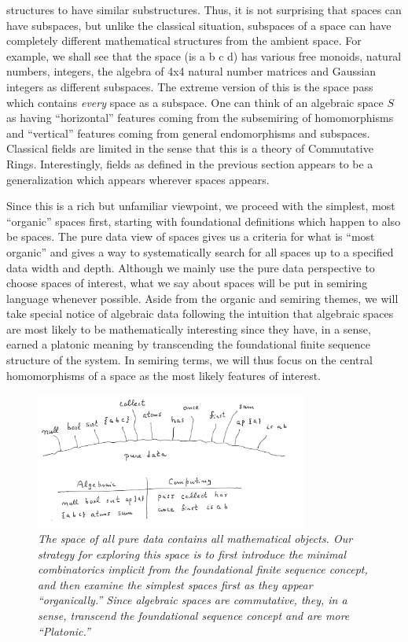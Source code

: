 \documentclass[11pt]{article}
\begin{document}
\begin{itemize}
{structures to have similar substructures.  Thus, it is not surprising that spaces can have subspaces, but unlike the classical situation, 
subspaces of a space can have completely different mathematical structures from the ambient space.  For example, we shall see that 
the space (is a b c d) has various free monoids, natural numbers, integers, the algebra of 4x4 natural number matrices and 
Gaussian integers as different subspaces.  The extreme version of this is the space pass which contains {\it every} space as a subspace.  One can think of 
an algebraic space $S$ as having ``horizontal'' features coming from the subsemiring of homomorphisms and ``vertical'' features 
coming from general endomorphisms and subspaces.  Classical fields are limited in the sense that this is a theory of Commutative Rings.  Interestingly, 
fields as defined in the previous section appears to be a generalization which appears wherever spaces appears.} 
\end{itemize}
Since this is a rich but unfamiliar 
viewpoint, we proceed with the simplest, most ``organic'' spaces first, starting with foundational definitions which happen to also 
be spaces.  The pure data view of spaces gives us a criteria for what is ``most organic'' and gives a way to systematically 
search for all spaces up to a specified data width and depth.  Although we mainly use the pure data perspective to 
choose spaces of interest, what we say about spaces will be put in semiring language whenever possible.  Aside from 
the organic and semiring themes, we will take special notice of algebraic data following the intuition that algebraic 
spaces are most likely to be mathematically interesting since they have, in a sense, earned a platonic meaning by 
transcending the foundational finite sequence structure of the system.  In semiring terms, we will thus focus on
the central homomorphisms of a space as the most likely features of interest. 

\begin{figure}[h]
\centering
\includegraphics[width=0.8\textwidth]{garden1.png}
\caption{{\it The space of all pure data contains all mathematical objects.  Our strategy for exploring this space is to first introduce 
the minimal combinatorics implicit from the foundational finite sequence concept, and then examine the simplest spaces first as they 
appear ``organically.''  Since algebraic spaces are commutative, they, in a sense, transcend the foundational sequence concept and are more ``Platonic.''}}
\end{figure}
\end{document}
